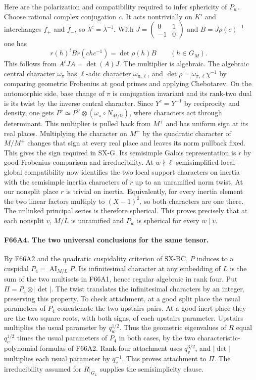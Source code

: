 Here are the polarization and compatibility required to infer
sphericity of $P_w$. Choose rational complex conjugation $c$.
It acts nontrivially on $K'$ and interchanges $f_+$ and $f_-$,
so $\lambda^c=\lambda^{-1}$. With
$J=\left(\begin{smallmatrix}0&1\\-1&0\end{smallmatrix}\right)$
and $B=J\rho(c)^{-1}$ one has
\[
    r(h)^t B r(chc^{-1})=\det\rho(h) B
                      \qquad(h\in G_M).
\]
This follows from $A^tJA=\det(A)J$. The multiplier is algebraic.
The algebraic central character $\omega_\pi$ has $\ell$-adic
character $\omega_{\pi,\ell}$, and
$\det\rho=\omega_{\pi,\ell}\chi^{-1}$ by comparing geometric
Frobenius at good primes and applying Chebotarev.
On the automorphic side, base change of $\pi$ is conjugation
invariant and its rank-two dual is its twist by the inverse central
character.  Since $Y^c=Y^{-1}$ by reciprocity and density, one gets
$P^c\simeq P^\vee\otimes(\omega_\pi\circ N_{M/\mathbb Q})$,
where characters act through determinant. This multiplier is pulled
back from $M^+$ and has uniform sign at its real places. Multiplying
the character on $M^+$ by the quadratic character of $M/M^+$
changes that sign at every real place and leaves its norm pullback
fixed. This gives the sign required in SX-G. Its semisimple Galois
representation is $r$ by good Frobenius comparison and irreducibility.
At $w\nmid\ell$ semisimplified local--global compatibility now
identifies the two local support characters on inertia with the
semisimple inertia characters of $r$ up to an unramified norm twist.
At our nonsplit place $r$ is trivial on inertia. Equivalently, for
every inertia element the two linear factors multiply to $(X-1)^2$,
so both characters are one there. The unlinked principal series
is therefore spherical. This proves precisely that at each nonsplit
$v$, $M/L$ is unramified and $P_w$ is spherical for every $w\mid v$.

\paragraph{F66A4. The two universal conclusions for the same tensor.}
By F66A2 and the quadratic cuspidality criterion of SX-BC,
$P$ induces to a cuspidal $P_4=\operatorname{AI}_{M/L}P$.
Its infinitesimal character at any embedding of $L$ is the sum
of the two multisets in F66A1, hence regular algebraic in rank
four. Put $\Pi=P_4\otimes|\det|$. The twist translates the
infinitesimal characters by an integer, preserving this property.
To check attachment, at a good split place the usual parameters
of $P_4$ concatenate the two upstairs pairs. At a good inert place
they are the two square roots, with both signs, of each upstairs
parameter. Upstairs multiplies the usual parameter by $q_w^{1/2}$.
Thus the geometric eigenvalues of $R$ equal $q_v^{1/2}$ times
the usual parameters of $P_4$ in both cases, by the two
characteristic-polynomial formulas of F66A2. Rank-four attachment
uses $q_v^{3/2}$, and $|\det|$ multiplies each usual parameter
by $q_v^{-1}$. This proves attachment to $\Pi$. The irreducibility
assumed for $R|_{G_L}$ supplies the semisimplicity clause.

